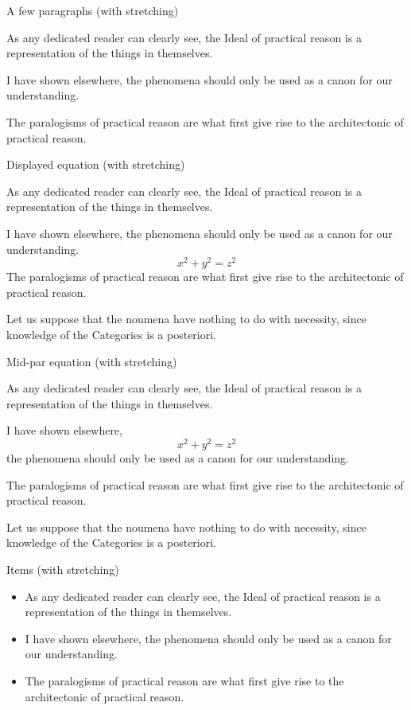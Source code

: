 \documentclass{beamer}
\let\svpar\par
\let\svitemize\itemize
\let\svenditemize\enditemize
\let\svitem\item
\def\newpar{\def\par{\svpar\vfill}}
\def\newitem{\def\item{\vfill\svitem}}
\let\svcenter\center
\let\svendcenter\endcenter
\let\svcolumn\column
\let\svendcolumn\endcolumn
\newlength\columnskip
\def\newcolumn{%
  \renewenvironment{column}[2]%
    {\svcolumn{##1}\setlength{\parskip}{\columnskip}##2}%
    {\svendcolumn\vspace{\columnskip}}}
\newcommand\stretchy{\only<2>{%
  \newpar\def\item{\svitem\newitem}%
  \renewenvironment{itemize}{\svitemize}{\svenditemize\newpar\par}%
  \renewenvironment{center}{\svcenter\newpar}{\svendcenter\newpar}%
  \newcolumn
}}
\begin{document}
\begin{frame}{A few paragraphs (with stretching)}
\stretchy

As any dedicated reader can clearly see, the Ideal of practical reason is a representation of the things in themselves.

I have shown elsewhere, the phenomena should only be used as a canon for our understanding.

The paralogisms of practical reason are what first give rise to the architectonic of practical reason.
\end{frame}

\begin{frame}{Displayed equation (with stretching)}
\stretchy

As any dedicated reader can clearly see, the Ideal of practical reason is a representation of the things in themselves.

I have shown elsewhere, the phenomena should only be used as a canon for our understanding.
\begin{equation*}
x^2 + y^2 = z^2
\end{equation*}
The paralogisms of practical reason are what first give rise to the architectonic of practical reason.

Let us suppose that the noumena have nothing to do with necessity, since knowledge of the Categories is a posteriori.
\end{frame}

\begin{frame}{Mid-par equation (with stretching)}
\stretchy

As any dedicated reader can clearly see, the Ideal of practical reason is a representation of the things in themselves.

I have shown elsewhere,
\begin{equation*}
x^2 + y^2 = z^2
\end{equation*}
the phenomena should only be used as a canon for our understanding.

The paralogisms of practical reason are what first give rise to the architectonic of practical reason.

Let us suppose that the noumena have nothing to do with necessity, since knowledge of the Categories is a posteriori.
\end{frame}

\begin{frame}{Items (with stretching)}
\stretchy

\begin{itemize}
\item As any dedicated reader can clearly see, the Ideal of practical reason is a representation of the things in themselves.
\item I have shown elsewhere, the phenomena should only be used as a canon for our understanding.
\item The paralogisms of practical reason are what first give rise to the architectonic of practical reason.
\end{itemize}
\end{frame}
\end{document}
